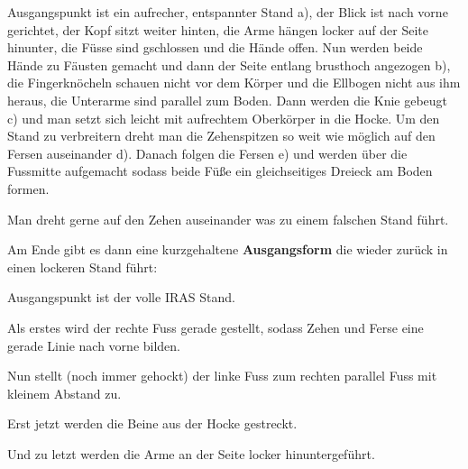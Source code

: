 Ausgangspunkt ist ein aufrecher, entspannter Stand a), der Blick ist nach vorne gerichtet, der Kopf sitzt weiter hinten, die Arme h\"angen locker auf der Seite hinunter, die F\"usse sind gschlossen und die H\"ande offen. Nun werden beide H\"ande zu F\"austen gemacht und dann der Seite entlang brusthoch angezogen b), die Fingerkn\"ocheln schauen nicht vor dem K\"orper und die Ellbogen nicht aus ihm heraus, die Unterarme sind parallel zum Boden. Dann werden die Knie gebeugt c) und man setzt sich leicht mit aufrechtem Oberk\"orper in die Hocke. Um den Stand zu verbreitern dreht man die Zehenspitzen so weit wie m\"oglich auf den Fersen auseinander d). Danach folgen die Fersen e) und werden \"uber die Fussmitte aufgemacht sodass beide F\"u{\ss}e ein gleichseitiges Dreieck am Boden formen.
	
\begin{WTCommonNoob}
	Man dreht gerne auf den Zehen auseinander was zu einem falschen Stand f\"uhrt.
\end{WTCommonNoob}




Am Ende gibt es dann eine kurzgehaltene \textbf{Ausgangsform} die wieder zur\"uck in einen lockeren Stand f\"uhrt:

\begin{WTalphenumNarrow}
	\item Ausgangspunkt ist der volle IRAS Stand.
	\item Als erstes wird der rechte Fuss gerade gestellt, sodass Zehen und Ferse eine gerade Linie nach vorne bilden.
	\item Nun stellt (noch immer gehockt) der linke Fuss zum rechten parallel Fuss mit kleinem Abstand zu.
	\item Erst jetzt werden die Beine aus der Hocke gestreckt.
	\item Und zu letzt werden die Arme an der Seite locker hinuntergef\"uhrt.
\end{WTalphenumNarrow}


\newpage



% 

